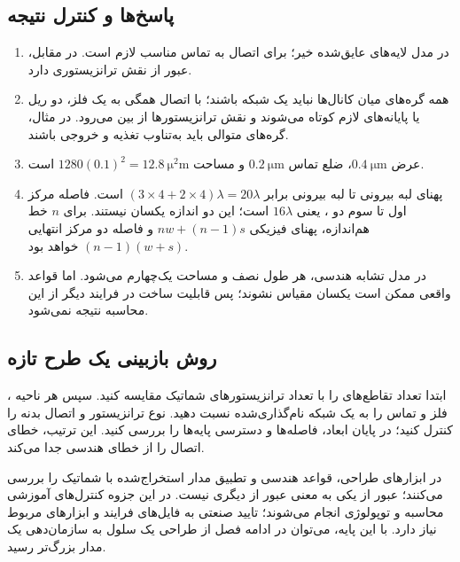 \subsection{پاسخ‌ها و کنترل نتیجه}
\begin{enumerate}
\item در مدل لایه‌های عایق‌شده خیر؛ برای اتصال  به 
تماس مناسب لازم است. در مقابل، عبور  از  نقش ترانزیستوری دارد.
\item همه گره‌های میان کانال‌ها نباید یک شبکه باشند؛ با اتصال همگی به یک فلز،
دو ریل یا پایانه‌های لازم کوتاه می‌شوند و نقش ترانزیستورها از بین می‌رود.
در مثال، گره‌های متوالی باید به‌تناوب تغذیه و خروجی باشند.
\item عرض \(\qty{0.4}{\micro\metre}\)، ضلع تماس
\(\qty{0.2}{\micro\metre}\) و مساحت
\(1280(0.1)^2=\qty{12.8}{\square\micro\metre}\) است.
\item پهنای لبه بیرونی تا لبه بیرونی برابر
\((3\times4+2\times4)\lambda=20\lambda\) است.
فاصله مرکز اول تا سوم دو ، یعنی \(16\lambda\) است؛
این دو اندازه یکسان نیستند. برای \(n\) خط هم‌اندازه، پهنای فیزیکی
\(nw+(n-1)s\) و فاصله دو مرکز انتهایی \((n-1)(w+s)\) خواهد بود.
\item در مدل تشابه هندسی، هر طول نصف و مساحت یک‌چهارم می‌شود.
اما قواعد واقعی ممکن است یکسان مقیاس نشوند؛ پس قابلیت ساخت در فرایند دیگر
از این محاسبه نتیجه نمی‌شود.
\end{enumerate}

\subsection{روش بازبینی یک طرح تازه}
ابتدا تعداد تقاطع‌های  را با تعداد ترانزیستورهای شماتیک مقایسه کنید.
سپس هر ناحیه ، فلز و تماس را به یک شبکه نام‌گذاری‌شده نسبت دهید.
نوع ترانزیستور و اتصال بدنه را کنترل کنید؛ در پایان ابعاد، فاصله‌ها و دسترسی پایه‌ها را بررسی کنید.
این ترتیب، خطای اتصال را از خطای هندسی جدا می‌کند.

در ابزارهای طراحی،  قواعد هندسی و  تطبیق مدار استخراج‌شده با
شماتیک را بررسی می‌کنند؛ عبور از یکی به معنی عبور از دیگری نیست.
در این جزوه کنترل‌های آموزشی محاسبه و توپولوژی انجام می‌شوند؛
تایید صنعتی به فایل‌های فرایند و ابزارهای مربوط نیاز دارد.
با این پایه، می‌توان در ادامه فصل از طراحی یک سلول به سازمان‌دهی یک مدار بزرگ‌تر رسید.

